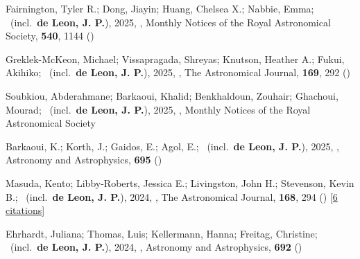 \item[{\color{numcolor}\scriptsize80}] Fairnington, Tyler R.; Dong, Jiayin; Huang, Chelsea X.; Nabbie, Emma; \etal\ (incl.\ \textbf{de Leon, J. P.}), 2025, , Monthly Notices of the Royal Astronomical Society, \textbf{540}, 1144 ()

\item[{\color{numcolor}\scriptsize79}] Greklek-McKeon, Michael; Vissapragada, Shreyas; Knutson, Heather A.; Fukui, Akihiko; \etal\ (incl.\ \textbf{de Leon, J. P.}), 2025, , The Astronomical Journal, \textbf{169}, 292 ()

\item[{\color{numcolor}\scriptsize78}] Soubkiou, Abderahmane; Barkaoui, Khalid; Benkhaldoun, Zouhair; Ghachoui, Mourad; \etal\ (incl.\ \textbf{de Leon, J. P.}), 2025, , Monthly Notices of the Royal Astronomical Society

\item[{\color{numcolor}\scriptsize77}] Barkaoui, K.; Korth, J.; Gaidos, E.; Agol, E.; \etal\ (incl.\ \textbf{de Leon, J. P.}), 2025, , Astronomy and Astrophysics, \textbf{695} ()

\item[{\color{numcolor}\scriptsize76}] Masuda, Kento; Libby-Roberts, Jessica E.; Livingston, John H.; Stevenson, Kevin B.; \etal\ (incl.\ \textbf{de Leon, J. P.}), 2024, , The Astronomical Journal, \textbf{168}, 294 () [\href{https://ui.adsabs.harvard.edu/abs/2024AJ....168..294M}{6 citations}]

\item[{\color{numcolor}\scriptsize75}] Ehrhardt, Juliana; Thomas, Luis; Kellermann, Hanna; Freitag, Christine; \etal\ (incl.\ \textbf{de Leon, J. P.}), 2024, , Astronomy and Astrophysics, \textbf{692} ()

